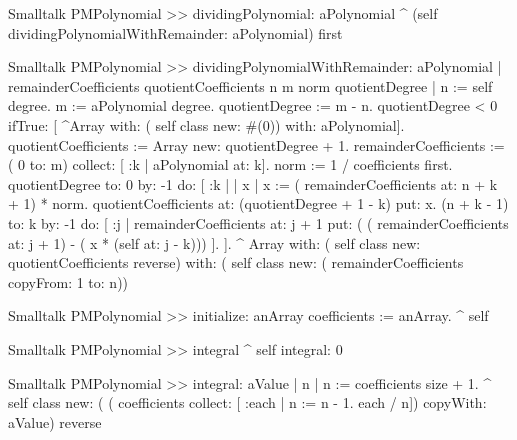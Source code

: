\begin{displaycode}{Smalltalk}
PMPolynomial >> dividingPolynomial: aPolynomial
    ^ (self dividingPolynomialWithRemainder: aPolynomial) first
\end{displaycode}

\begin{displaycode}{Smalltalk}
PMPolynomial >> dividingPolynomialWithRemainder: aPolynomial
    | remainderCoefficients quotientCoefficients n m norm 
                                                      quotientDegree |
    n := self degree.
    m := aPolynomial degree.
    quotientDegree := m - n.
    quotientDegree < 0
        ifTrue: [ ^Array with: ( self class new: #(0)) with: 
                                                         aPolynomial].
    quotientCoefficients := Array new: quotientDegree + 1.
    remainderCoefficients := ( 0 to: m) collect: [ :k | aPolynomial 
                                                               at: k].
    norm := 1 / coefficients first.
    quotientDegree to: 0 by: -1
        do: [ :k | | x |
              x := ( remainderCoefficients at: n + k + 1) * norm.
              quotientCoefficients at: (quotientDegree + 1 - k) put: 
                                                                    x.
              (n + k - 1) to: k by: -1
                do: [ :j | 
                remainderCoefficients at: j + 1 put: 
                            ( ( remainderCoefficients at: j + 1) - ( 
                                                x * (self at: j - k)))
                ].
            ].
    ^ Array with: ( self class new: quotientCoefficients reverse)
           with: ( self class new: ( remainderCoefficients copyFrom: 1 to: n))
\end{displaycode}

\begin{displaycode}{Smalltalk}
PMPolynomial >> initialize: anArray
    coefficients := anArray.
    ^ self
\end{displaycode}

\begin{displaycode}{Smalltalk}
PMPolynomial >> integral
    ^ self integral: 0
\end{displaycode}

\begin{displaycode}{Smalltalk}
PMPolynomial >> integral: aValue
    | n |
    n := coefficients size + 1.
    ^ self class new: ( ( coefficients collect: [ :each | n := n - 1. 
                                  each / n]) copyWith: aValue) reverse
\end{displaycode}

